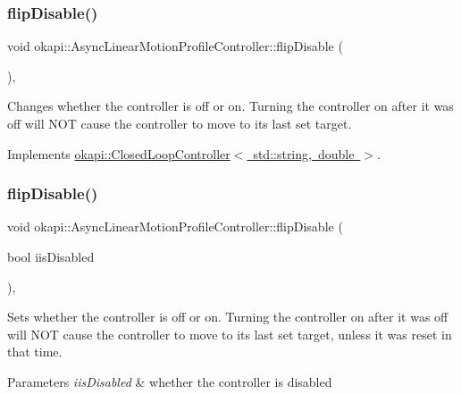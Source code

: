 \subsubsection{\texorpdfstring{flipDisable()}{flipDisable()}\hspace{0.1cm}{\footnotesize\ttfamily [1/2]}}
{\footnotesize\ttfamily void okapi\+::\+Async\+Linear\+Motion\+Profile\+Controller\+::flip\+Disable (\begin{DoxyParamCaption}{ }\end{DoxyParamCaption})\hspace{0.3cm}{\ttfamily [override]}, {\ttfamily [virtual]}}

Changes whether the controller is off or on. Turning the controller on after it was off will N\+OT cause the controller to move to its last set target. 

Implements \mbox{\hyperlink{classokapi_1_1ClosedLoopController_a9de69b60885df41cd2164fe1a23f34d3}{okapi\+::\+Closed\+Loop\+Controller$<$ std\+::string, double $>$}}.

\mbox{\label{classokapi_1_1AsyncLinearMotionProfileController_a3072d7ac1e5d0f387f739657e9f82fd8}} 
\subsubsection{\texorpdfstring{flipDisable()}{flipDisable()}\hspace{0.1cm}{\footnotesize\ttfamily [2/2]}}
{\footnotesize\ttfamily void okapi\+::\+Async\+Linear\+Motion\+Profile\+Controller\+::flip\+Disable (\begin{DoxyParamCaption}\item[{bool}]{iis\+Disabled }\end{DoxyParamCaption})\hspace{0.3cm}{\ttfamily [override]}, {\ttfamily [virtual]}}

Sets whether the controller is off or on. Turning the controller on after it was off will N\+OT cause the controller to move to its last set target, unless it was reset in that time.


\begin{DoxyParams}{Parameters}
{\em iis\+Disabled} & whether the controller is disabled \\
\hline
\end{DoxyParams}


